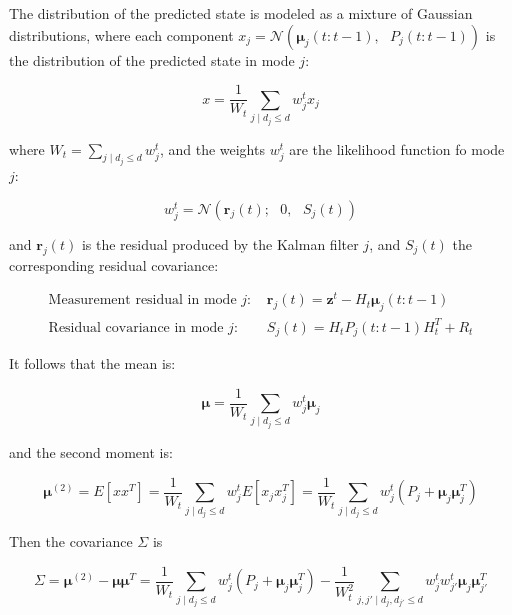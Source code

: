 \noindent The distribution of the predicted state is modeled as a mixture of Gaussian distributions, where each component $x_{j}=\mathcal{N}(\boldsymbol\mu_{j}(t:t-1), \text{ }P_{j}(t:t-1))$ is the distribution of the predicted state in mode $j$:

\begin{equation}
x = \frac{1}{W_{t}}\sum_{j\mid d_{j}\leq d}{w_{j}^{t}x_{j}}
\label{eq:mixture2}
\end{equation}

\noindent where $W_{t}=\sum_{j\mid d_{j}\leq d}{w_{j}^{t}}$, and the weights $w_{j}^{t}$ are the likelihood function fo mode $j$:

\begin{equation}
w_{j}^{t} = \mathcal{N}(\boldsymbol r_{j}(t); \text{ }0, \text{ }S_{j}(t))
\label{eq:weightsMixture}
\end{equation}

\noindent and $\boldsymbol r_{j}(t)$ is the residual produced by the Kalman filter $j$, and $S_{j}(t)$ the corresponding residual covariance:

\begin{equation}
\begin{array}{ll}
\text{Measurement residual in mode $j$: } & \boldsymbol r_{j}(t) = \boldsymbol z^{t} - H_{t}\boldsymbol\mu_{j}(t:t-1)\\
\text{Residual covariance in mode $j$: } & S_{j}(t) = H_{t}P_{j}(t:t-1)H_{t}^{T}+R_{t}
\end{array}
\label{eq:weightsMixture2}
\end{equation}

\noindent It follows that the mean is:

\begin{equation}
\boldsymbol \mu = \frac{1}{W_{t}}\sum_{j\mid d_{j}\leq d}{w_{j}^{t}\boldsymbol\mu_{j}}
\label{eq:mixture3}
\end{equation}

\noindent and the second moment is:

\begin{equation}
\boldsymbol \mu^{(2)} = E\left[xx^{T}\right]= \frac{1}{W_{t}}\sum_{j\mid d_{j}\leq d}{w_{j}^{t}E\left[x_{j}x^{T}_{j}\right]} = \frac{1}{W_{t}}\sum_{j\mid d_{j}\leq d}{w_{j}^{t}\left(P_{j} + \boldsymbol\mu_{j} \boldsymbol\mu^{T}_{j}\right)}
\label{eq:mixture4}
\end{equation}

\noindent Then the covariance $\Sigma$ is

\begin{equation}
\Sigma = \boldsymbol\mu^{(2)} - \boldsymbol\mu \boldsymbol\mu^{T} = \frac{1}{W_{t}}\sum_{j\mid d_{j}\leq d}{w_{j}^{t}\left(P_{j} + \boldsymbol\mu_{j} \boldsymbol\mu^{T}_{j}\right)} - \frac{1}{W^{2}_{t}}\sum_{j,j'\mid d_{j},d_{j'}\leq d}{w_{j}^{t}w_{j'}^{t}\boldsymbol\mu_{j} \boldsymbol\mu^{T}_{j'}}
\label{eq:mixture5}
\end{equation}

